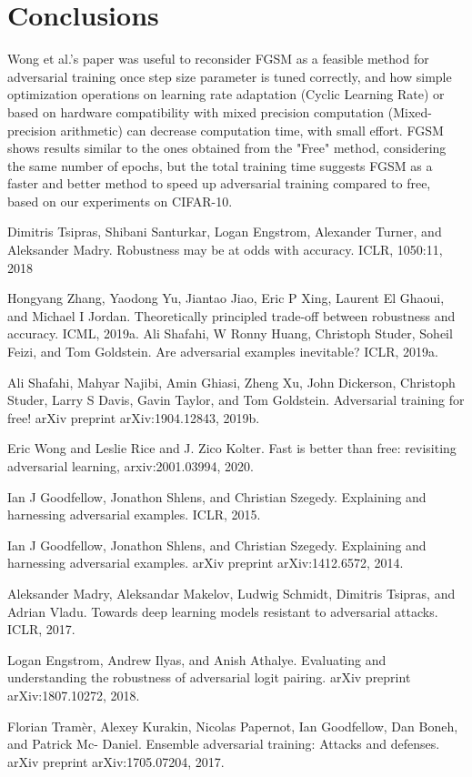 \documentclass{article}
\begin{document}
\newpage
\section{Conclusions}
Wong et al.'s paper \cite{WongEtAl2020} was useful to reconsider FGSM as a feasible method for adversarial training once step size parameter is tuned correctly, and how simple optimization operations on learning rate adaptation (Cyclic Learning Rate) or based on hardware compatibility with mixed precision computation (Mixed-precision arithmetic) can decrease computation time, with small effort.
FGSM shows results similar to the ones obtained from the "Free" method, considering the same number of epochs, but the total training time suggests FGSM as a faster and better method to speed up adversarial training compared to free, based on our experiments on CIFAR-10.   



\begin{thebibliography}{100} 
	 {Dimitris Tsipras, Shibani Santurkar, Logan Engstrom, Alexander Turner, and Aleksander Madry. Robustness may be at odds with accuracy. ICLR, 1050:11, 2018}

	 {Hongyang Zhang, Yaodong Yu, Jiantao Jiao, Eric P Xing, Laurent El Ghaoui, and Michael I Jordan. Theoretically principled trade-off between robustness and accuracy. ICML, 2019a.}
	 {Ali Shafahi, W Ronny Huang, Christoph Studer, Soheil Feizi, and Tom Goldstein. Are adversarial examples inevitable? ICLR, 2019a.}
	
	 {Ali Shafahi, Mahyar Najibi, Amin Ghiasi, Zheng Xu, John Dickerson, Christoph Studer, Larry S
		Davis, Gavin Taylor, and Tom Goldstein. Adversarial training for free!
		arXiv preprint
		arXiv:1904.12843, 2019b.}
	
	 {Eric Wong and Leslie Rice and J. Zico Kolter. Fast is better than free: revisiting adversarial learning, arxiv:2001.03994, 2020.}
	
	 {Ian J Goodfellow, Jonathon Shlens, and Christian Szegedy. Explaining and harnessing adversarial examples. ICLR, 2015.}
	
	 {Ian J Goodfellow, Jonathon Shlens, and Christian Szegedy. Explaining and harnessing adversarial examples. arXiv preprint arXiv:1412.6572, 2014.}
	
	 {Aleksander Madry, Aleksandar Makelov, Ludwig Schmidt, Dimitris Tsipras, and Adrian Vladu. Towards deep learning models resistant to adversarial attacks. ICLR, 2017.}
	
	 {Logan Engstrom, Andrew Ilyas, and Anish Athalye. Evaluating and understanding the robustness of adversarial logit pairing. arXiv preprint arXiv:1807.10272, 2018.}
	
	 {Florian Tramèr, Alexey Kurakin, Nicolas Papernot, Ian Goodfellow, Dan Boneh, and Patrick Mc-
		Daniel. Ensemble adversarial training: Attacks and defenses. arXiv preprint arXiv:1705.07204,
		2017.}
	
\end{thebibliography}
	
\end{document}
